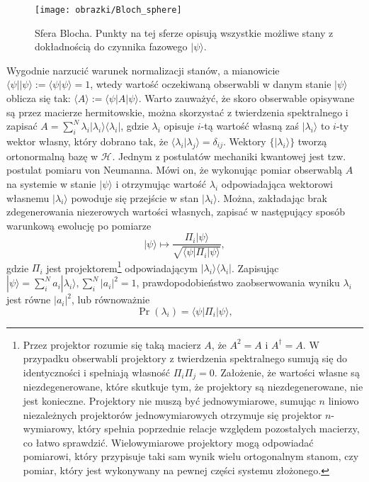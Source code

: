 \documentclass[10pt]{article} %
\newcommand{\Hx}[1]{\mathcal{H}^{#1}}
\newcommand{\Pro}[1]{\Pr(#1)}
\newcommand{\Ket}[1]{|#1\rangle}
\newcommand{\Bra}[1]{\langle#1|}
\newcommand{\Braket}[1]{\langle#1\rangle}
\newcommand{\KP}{\Ket{\psi}}
\newcommand{\BP}{\Bra{\psi}}
\begin{document}
\begin{figure}[t]
\centering
\texttt{[image: obrazki/Bloch\_sphere]}
\caption{Sfera Blocha. Punkty na tej sferze opisują wszystkie możliwe stany z dokładnością do czynnika fazowego $\KP$.}
\label{fig:bloch}
\end{figure}
Wygodnie narzucić warunek normalizacji stanów, a mianowicie $\Bra{\psi}\Ket{\psi} := \Braket{\psi|\psi} = 1$, wtedy wartość oczekiwaną obserwabli w danym stanie $\Ket{\psi}$ oblicza się tak: $\Braket{A} := \Bra{\psi}A\Ket{\psi}$. Warto zauważyć, że skoro obserwable opisywane są przez macierze hermitowskie, można 
skorzystać z twierdzenia spektralnego i zapisać $A = \sum_i^N \lambda_i \Ket{\lambda_i}\Bra{\lambda_i}$, gdzie $\lambda_i$ opisuje $i$-tą wartość własną zaś $\Ket{\lambda_i}$ to $i$-ty wektor własny, który dobrano tak, że $\Braket{\lambda_i|\lambda_j} = \delta_{ij}$. Wektory $\{\Ket{\lambda_i}\}$ tworzą ortonormalną bazę w $\Hx{}$. Jednym z postulatów mechaniki kwantowej jest tzw. postulat pomiaru von Neumanna. Mówi on, że wykonując pomiar obserwablą $A$ na systemie w stanie $\Ket{\psi}$ i otrzymując wartość $\lambda_i$ odpowiadająca wektorowi własnemu $\Ket{\lambda_i}$ powoduje się przejście w stan $\Ket{\lambda_i}$. Można, zakładając brak zdegenerowania niezerowych wartości własnych, zapisać w następujący sposób warunkową ewolucję po pomiarze 
\begin{equation}
\label{eq:cond_ev}
\Ket{\psi} \mapsto \frac{\Pi_i\Ket{\psi}}{\sqrt{\Bra{\psi}\Pi_i \Ket{\psi}}},
\end{equation}
gdzie $\Pi_i$ jest projektorem\footnote{Przez projektor rozumie się taką macierz $A$, że $A^2 = A$ i $A^\dag = A$. W przypadku obserwabli projektory z twierdzenia spektralnego sumują się do identyczności i spełniają własność $\Pi_i \Pi_j =0$. Założenie, że wartości własne są niezdegenerowane, które skutkuje tym, że projektory są niezdegenerowane, nie jest konieczne. Projektory nie muszą być jednowymiarowe, sumując $n$ liniowo niezależnych projektorów jednowymiarowych otrzymuje się projektor $n$-wymiarowy, który spełnia poprzednie relacje względem pozostałych macierzy, co łatwo sprawdzić. Wielowymiarowe projektory mogą odpowiadać pomiarowi, który przypisuje taki sam wynik wielu ortogonalnym stanom, czy pomiar, który jest wykonywany na pewnej części systemu złożonego.} odpowiadającym $\Ket{\lambda_i}\Bra{\lambda_i}$. Zapisując $\KP = \sum^N_i a_i \Ket{\lambda_i}, \sum^N_i |a_i|^2=1$, prawdopodobieństwo zaobserwowania wyniku $\lambda_i$ jest równe $|a_i|^2$, lub równoważnie
\begin{equation}
\Pro{\lambda_i} = \BP \Pi_i \KP,
\end{equation}
\end{document}
